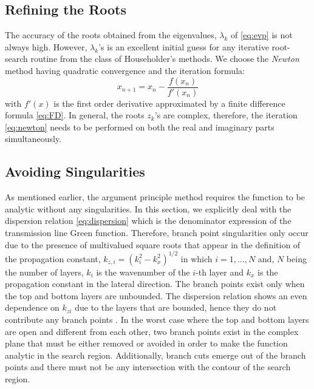 \subsection{Refining the Roots}
%
The accuracy of the roots obtained from the eigenvalues, $\lambda_k$ of \eqref{eq:evp} is not always high. However, $\lambda_k$'s is an excellent initial guess for any iterative root-search routine from the class of Householder's methods. We choose the \emph{Newton} method \cite{Press2007} having quadratic convergence and the iteration formula:
%
\begin{equation}
  x_{n+1} = x_n - \frac {f(x_n)}{f'(x_n)}
  \label{eq:newton}
\end{equation}
%
with $f'(x)$ is the first order derivative approximated by a finite difference formula \eqref{eq:FD}. In general, the roots $z_k$'s are complex, therefore, the iteration \eqref{eq:newton} needs to be performed on both the real and imaginary parts simultaneously.
\subsection{Avoiding Singularities}
%
As mentioned earlier, the argument principle method requires the function to be analytic without any singularities. In this section, we explicitly deal with the dispersion relation \eqref{eq:dispersion} which is the denominator expression of the transmission line Green function. Therefore, branch point singularities only occur due to the presence of multivalued square roots that appear in the definition of the propagation constant, $k_{z,i} = (k_i^2 - k_x^2)^{1/2}$ in which $i =1,\dots, N$ and, $N$ being the number of layers, $k_i$ is the wavenumber of the $i$-th layer and $k_x$ is the propagation constant in the lateral direction. The branch points exist only when the top and bottom layers are unbounded. The dispersion relation shows an even dependence on $k_{zi}$ due to the layers that are bounded, hence they do not  contribute any branch points \cite[Section~5.3a]{Felsen1994}. In the worst case where the top and bottom layers are open and different from each other, two branch points exist in the complex plane that must be either removed or avoided in order to make the function analytic in the search region. Additionally, branch cuts emerge out of the branch points and there must not be any intersection with the contour of the search region.

